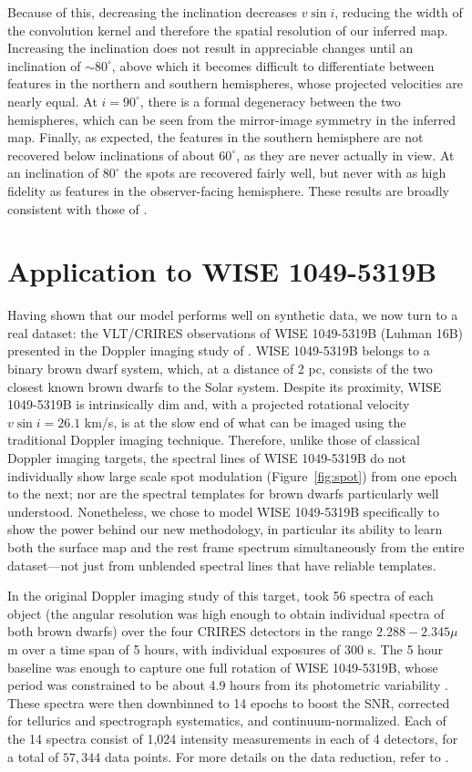 \documentclass[modern]{aastex631}
\begin{document}
Because of this, decreasing the inclination decreases $v\sin i$, reducing the width of the convolution kernel and therefore the spatial resolution of our inferred map.
Increasing the inclination does not result in appreciable changes until an inclination of $\sim 80^\circ$, above which it becomes difficult to differentiate between features in the northern and southern hemispheres, whose projected velocities are nearly equal. 
At $i = 90^\circ$, there is a formal degeneracy between the two hemispheres, which can be seen from the mirror-image symmetry in the inferred map. 
Finally, as expected, the features in the southern hemisphere are not recovered below inclinations of about $60^\circ$, as they are never actually in view. 
At an inclination of $80^\circ$ the spots are recovered fairly well, but never with as high fidelity as features in the observer-facing hemisphere.
These results are broadly consistent with those of \citet{Vogt1987}.


\section{Application to WISE 1049-5319B}
\label{sec:luhman16b}
%

Having shown that our model performs well on synthetic data, we now turn to a real dataset: the VLT/CRIRES observations of WISE 1049-5319B (Luhman 16B) presented in the Doppler imaging study of \citet{Crossfield2014}.
WISE 1049-5319B belongs to a binary brown dwarf system, which, at a distance of 2 pc, consists of the two closest known brown dwarfs to the Solar system.
Despite its proximity, WISE 1049-5319B is intrinsically dim and, with a projected rotational velocity $v \sin i = 26.1$ km/s, is at the slow end of what can be imaged using the traditional Doppler imaging technique.
Therefore, unlike those of classical Doppler imaging targets, the spectral lines of WISE 1049-5319B do not individually show large scale spot modulation (Figure~\ref{fig:spot}) from one epoch to the next; nor are the spectral templates for brown dwarfs particularly well understood.
Nonetheless, we chose to model WISE 1049-5319B specifically to show the power behind our new methodology, in particular its ability to learn both the surface map and the rest frame spectrum simultaneously from the entire dataset---not just from unblended spectral lines that have reliable templates.

In the original Doppler imaging study of this target, \citet{Crossfield2014} took 56 spectra of each object (the angular resolution was high enough to obtain individual spectra of both brown dwarfs) over the four CRIRES detectors in the range $2.288-2.345 \mu$m over a time span of 5 hours, with individual exposures of 300 s.
The 5 hour baseline was enough to capture one full rotation of WISE 1049-5319B, whose period was constrained to be about 4.9 hours from its photometric variability \citep{Gillon2013}.
These spectra were then downbinned to 14 epochs to boost the SNR, corrected for tellurics and spectrograph systematics, and continuum-normalized.
Each of the 14 spectra consist of 1,024 intensity measurements in each of 4 detectors, for a total of $57,344$ data points.
For more details on the data reduction, refer to \citet{Crossfield2014}.
\end{document}

